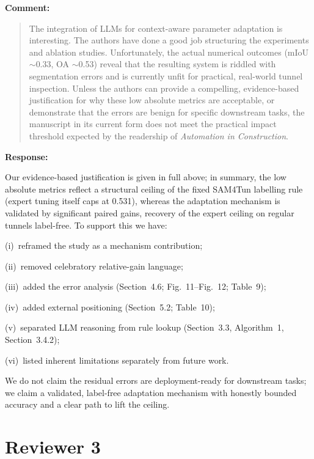 \documentclass[11pt,a4paper]{article}
\newcommand{\MSErrorCompositionTable}{Table~9}
\newcommand{\MSSOTATable}{Table~10}
\newcommand{\MSErrorMechanismFigure}{Fig.~11}
\newcommand{\MSErrorMapFigure}{Fig.~12}
\newenvironment{commentblock}{%
  \par\smallskip\noindent\textbf{Comment:}\par
  \begin{quote}\itshape\color{black}
}{%
  \end{quote}\smallskip
}
\newenvironment{responseblock}{%
  \par\smallskip\noindent\textbf{Response:}\par
  \begingroup\color{responsegreen}
}{%
  \endgroup\smallskip
}
\begin{document}
\begin{commentblock}
The integration of LLMs for context-aware parameter adaptation is interesting. The authors have done a good job structuring the experiments and ablation studies. Unfortunately, the actual numerical outcomes (mIoU $\sim$0.33, OA $\sim$0.53) reveal that the resulting system is riddled with segmentation errors and is currently unfit for practical, real-world tunnel inspection. Unless the authors can provide a compelling, evidence-based justification for why these low absolute metrics are acceptable, or demonstrate that the errors are benign for specific downstream tasks, the manuscript in its current form does not meet the practical impact threshold expected by the readership of \emph{Automation in Construction}.
\end{commentblock}
\begin{responseblock}
Our evidence-based justification is given in full above; in summary, the low absolute metrics reflect a structural ceiling of the fixed SAM4Tun labelling rule (expert tuning itself caps at 0.531), whereas the adaptation mechanism is validated by significant paired gains, recovery of the expert ceiling on regular tunnels label-free. To support this we have:

(i)~reframed the study as a mechanism contribution; 

(ii)~removed celebratory relative-gain language;

(iii)~added the error analysis (Section~4.6; \MSErrorMechanismFigure--\MSErrorMapFigure; \MSErrorCompositionTable); 

(iv)~added external positioning (Section~5.2; \MSSOTATable);

(v)~separated LLM reasoning from rule lookup (Section~3.3, Algorithm~1, Section~3.4.2); 

(vi)~listed inherent limitations separately from future work. 

We do not claim the residual errors are deployment-ready for downstream tasks; we claim a validated, label-free adaptation mechanism with honestly bounded accuracy and a clear path to lift the ceiling.
\end{responseblock}

\section*{Reviewer 3}
\end{document}
